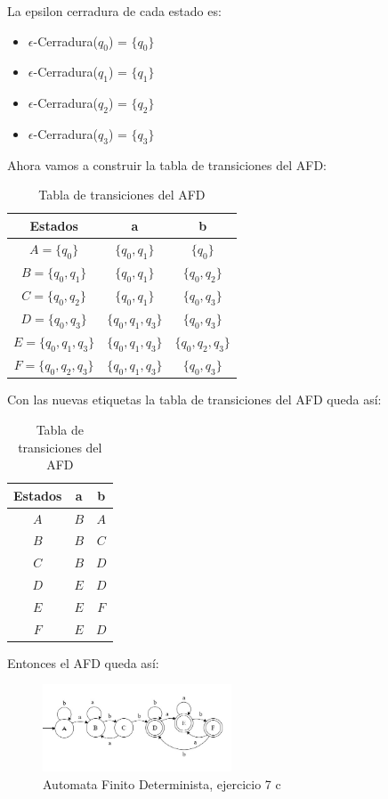 \begin{enumerate}
    La epsilon cerradura de cada estado es:
    \begin{itemize}
        \item $\epsilon$-Cerradura($q_0$) = $\{q_0\}$
        \item $\epsilon$-Cerradura($q_1$) = $\{q_1\}$
        \item $\epsilon$-Cerradura($q_2$) = $\{q_2\}$
        \item $\epsilon$-Cerradura($q_3$) = $\{q_3\}$
    \end{itemize}
    Ahora vamos a construir la tabla de transiciones del AFD:

    \begin{table}[h!]
    \centering
    \begin{tabular}{|c|c|c|}
    \hline
    \textbf{Estados} & \textbf{a} & \textbf{b } \\
    \hline
    $A = \{q_0\}$ &$\{q_0, q_1\}$ & $\{q_0\}$ \\
    \hline      
    $B = \{q_0, q_1\}$ & $\{q_0, q_1\}$  & $\{q_0, q_2\}$  \\
    \hline 
    $C = \{q_0, q_2\}$ & $\{q_0, q_1\}$ & $\{q_0, q_3\}$  \\
    \hline
    $D = \{q_0, q_3\}$ & $\{q_0, q_1, q_3\}$  & $\{q_0, q_3\}$  \\
    \hline
    $E =\{q_0, q_1, q_3\}$ & $\{q_0, q_1, q_3\}$  & $\{q_0, q_2, q_3\}$  \\
    \hline
    $F = \{q_0, q_2, q_3\}$ & $\{q_0, q_1, q_3\}$  & $\{q_0, q_3\}$  \\
    \hline
    \end{tabular}
    \caption{Tabla de transiciones del AFD} 
    \end{table}

\end{enumerate}

Con las nuevas etiquetas la tabla de transiciones del AFD queda así:
\begin{table}[h!]
    \centering
    \begin{tabular}{|c|c|c|}
    \hline
    \textbf{Estados} & \textbf{a} & \textbf{b } \\
    \hline
    $A$ &$B$ & $A$ \\
    \hline      
    $B$ & $B$  & $C$  \\
    \hline 
    $C$ & $B$ & $D$  \\
    \hline
    $D$ & $E$  & $D$  \\
    \hline
    $E$ & $E$  & $F$  \\
    \hline
    $F$ & $E$  & $D$  \\
    \hline
    \end{tabular}
    \caption{Tabla de transiciones del AFD} 
    \end{table}
Entonces el AFD queda así:

\begin{figure}[h!]
    \centering
    \includegraphics[width=0.5\textwidth]{images/7cDFA.jpeg}
    \caption{Automata Finito Determinista, ejercicio 7 c}
\end{figure}